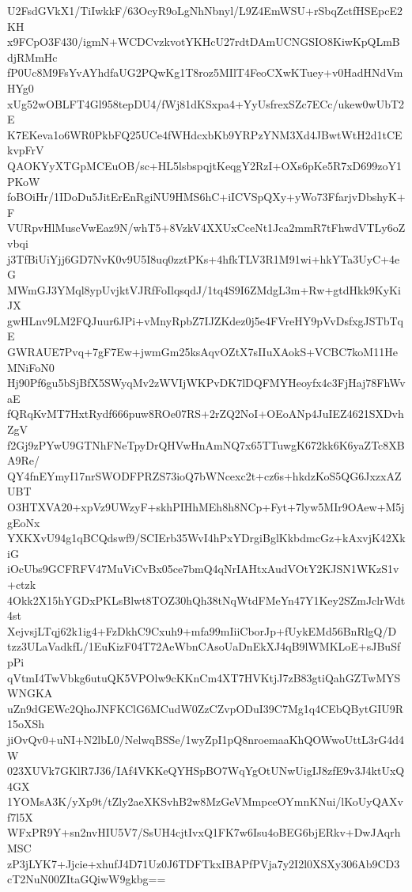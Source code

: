 U2FsdGVkX1/TiIwkkF/63OcyR9oLgNhNbnyl/L9Z4EmWSU+rSbqZctfHSEpcE2KH
x9FCpO3F430/igmN+WCDCvzkvotYKHcU27rdtDAmUCNGSIO8KiwKpQLmBdjRMmHc
fP0Uc8M9FsYvAYhdfaUG2PQwKg1T8roz5MIlT4FeoCXwKTuey+v0HadHNdVmHYg0
xUg52wOBLFT4Gl958tepDU4/fWj81dKSxpa4+YyUsfrexSZc7ECc/ukew0wUbT2E
K7EKeva1o6WR0PkbFQ25UCe4fWHdcxbKb9YRPzYNM3Xd4JBwtWtH2d1tCEkvpFrV
QAOKYyXTGpMCEuOB/sc+HL5lsbspqjtKeqgY2RzI+OXs6pKe5R7xD699zoY1PKoW
foBOiHr/1IDoDu5JitErEnRgiNU9HMS6hC+iICVSpQXy+yWo73FfarjvDbshyK+F
VURpvHlMuscVwEaz9N/whT5+8VzkV4XXUxCceNt1Jca2mmR7tFhwdVTLy6oZvbqi
j3TfBiUiYjj6GD7NvK0v9U5I8uq0zztPKs+4hfkTLV3R1M91wi+hkYTa3UyC+4eG
MWmGJ3YMql8ypUvjktVJRfFoIlqsqdJ/1tq4S9I6ZMdgL3m+Rw+gtdHkk9KyKiJX
gwHLnv9LM2FQJuur6JPi+vMnyRpbZ7IJZKdez0j5e4FVreHY9pVvDsfxgJSTbTqE
GWRAUE7Pvq+7gF7Ew+jwmGm25ksAqvOZtX7sIIuXAokS+VCBC7koM11HeMNiFoN0
Hj90Pf6gu5bSjBfX5SWyqMv2zWVIjWKPvDK7lDQFMYHeoyfx4c3FjHaj78FhWvaE
fQRqKvMT7HxtRydf666puw8ROe07RS+2rZQ2NoI+OEoANp4JuIEZ4621SXDvhZgV
f2Gj9zPYwU9GTNhFNeTpyDrQHVwHnAmNQ7x65TTuwgK672kk6K6yaZTc8XBA9Re/
QY4fnEYmyI17nrSWODFPRZS73ioQ7bWNcexc2t+cz6s+hkdzKoS5QG6JxzxAZUBT
O3HTXVA20+xpVz9UWzyF+skhPIHhMEh8h8NCp+Fyt+7lyw5MIr9OAew+M5jgEoNx
YXKXvU94g1qBCQdswf9/SCIErb35WvI4hPxYDrgiBglKkbdmcGz+kAxvjK42XkiG
iOcUbs9GCFRFV47MuViCvBx05ce7bmQ4qNrIAHtxAudVOtY2KJSN1WKzS1v+ctzk
4Okk2X15hYGDxPKLsBlwt8TOZ30hQh38tNqWtdFMeYn47Y1Key2SZmJclrWdt4st
XejvsjLTqj62k1ig4+FzDkhC9Cxuh9+mfa99mIiiCborJp+fUykEMd56BnRlgQ/D
tzz3ULaVadkfL/1EuKizF04T72AeWbnCAsoUaDnEkXJ4qB9lWMKLoE+sJBuSfpPi
qVtmI4TwVbkg6utuQK5VPOlw9cKKnCm4XT7HVKtjJ7zB83gtiQahGZTwMYSWNGKA
uZn9dGEWc2QhoJNFKClG6MCudW0ZzCZvpODuI39C7Mg1q4CEbQBytGIU9R15oXSh
jiOvQv0+uNI+N2lbL0/NelwqBSSe/1wyZpI1pQ8nroemaaKhQOWwoUttL3rG4d4W
023XUVk7GKlR7J36/IAf4VKKeQYHSpBO7WqYgOtUNwUigIJ8zfE9v3J4ktUxQ4GX
1YOMsA3K/yXp9t/tZly2aeXKSvhB2w8MzGeVMmpceOYmnKNui/lKoUyQAXvf7l5X
WFxPR9Y+sn2nvHIU5V7/SsUH4cjtIvxQ1FK7w6Isu4oBEG6bjERkv+DwJAqrhMSC
zP3jLYK7+Jjcie+xhufJ4D71Uz0J6TDFTkxIBAPfPVja7y2I2l0XSXy306Ab9CD3
cT2NuN00ZItaGQiwW9gkbg==
